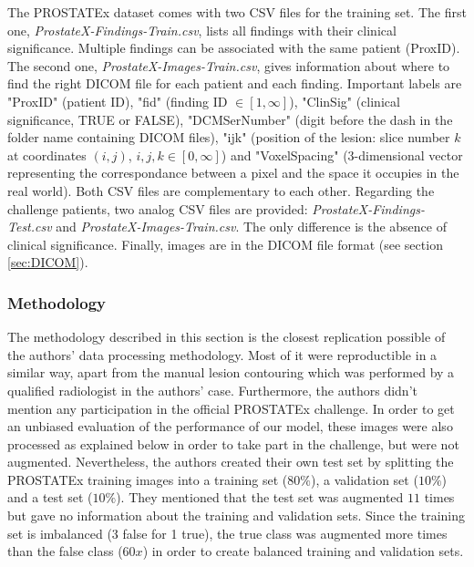 The PROSTATEx dataset comes with two CSV files for the training set. The first one, \textit{ProstateX-Findings-Train.csv}, lists all findings with their clinical significance. Multiple findings can be associated with the same patient (ProxID). The second one, \textit{ProstateX-Images-Train.csv}, gives information about where to find the right DICOM file for each patient and each finding. Important labels are "ProxID" (patient ID), "fid" (finding ID $\in [1,\infty]$), "ClinSig" (clinical significance, TRUE or FALSE), "DCMSerNumber" (digit before the dash in the folder name containing DICOM files), "ijk" (position of the lesion: slice number $k$ at coordinates $(i,j)$, $i,j,k \in [0,\infty]$) and "VoxelSpacing" (3-dimensional vector representing the correspondance between a pixel and the space it occupies in the real world). Both CSV files are complementary to each other. Regarding the challenge patients, two analog CSV files are provided: \textit{ProstateX-Findings-Test.csv} and \textit{ProstateX-Images-Train.csv}. The only difference is the absence of clinical significance. Finally, images are in the DICOM file format (see section \ref{sec:DICOM}). 


\subsubsection{Methodology}
The methodology described in this section is the closest replication possible of the authors' data processing methodology. Most of it were reproductible in a similar way, apart from the manual lesion contouring which was performed by a qualified radiologist in the authors' case. Furthermore, the authors didn't mention any participation in the official PROSTATEx challenge. In order to get an unbiased evaluation of the performance of our model, these images were also processed as explained below in order to take part in the challenge, but were not augmented. Nevertheless, the authors created their own test set by splitting the PROSTATEx training images into a training set ($80\%$), a validation set ($10\%$) and a test set ($10\%$). They mentioned that the test set was augmented $11$ times but gave no information about the training and validation sets. Since the training set is imbalanced (3 false for 1 true), the true class was augmented more times than the false class ($60x$) in order to create balanced training and validation sets. 


